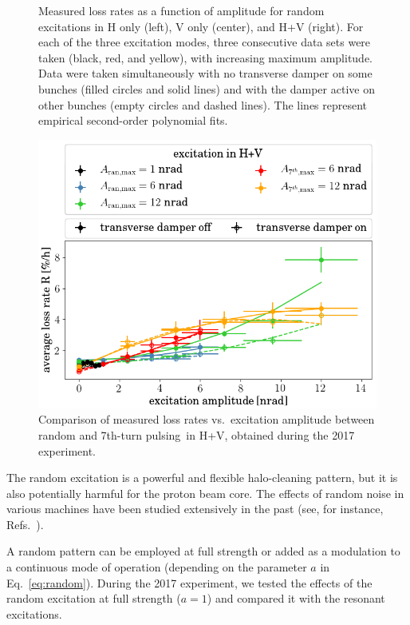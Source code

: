 \documentclass[
prstab
,reprint
,linenumbers
,longbibliography
,preprintnumbers
,showkeys
,amsfonts,amssymb,amsmath
,floatfix
]{revtex4-1}
\newcommand{\seventhtp}{7th-turn pulsing}
\begin{document}
\begin{figure}
\begin{tabular}{ccc}
  \end{tabular}
  \caption{Measured loss rates as a function of amplitude for random
    excitations in H only (left), V only (center), and H+V
    (right). For each of the three excitation modes, three consecutive
    data sets were taken (black, red, and yellow), with increasing
    maximum amplitude. Data were taken simultaneously with no
    transverse damper on some bunches (filled circles and solid lines)
    and with the damper active on other bunches (empty circles and
    dashed lines). The lines represent empirical second-order
    polynomial fits.}
  \label{fig:ranexplossplane}
\end{figure}


\begin{figure}
  \centering
  \includegraphics[width=\columnwidth]{2017_scale_amp_7th_ranhv_lblshort.png}
  \caption{Comparison of measured loss rates vs.\ excitation amplitude
    between random and \seventhtp\ in H+V, obtained during the 2017
    experiment.}
  \label{fig:ranexploss}
\end{figure}


The random excitation is a powerful and flexible halo-cleaning
pattern, but it is also potentially harmful for the proton beam
core. The effects of random noise in various machines have been
studied extensively in the past (see, for instance,
Refs.~\cite{noise_lebedev_ssc, noise_alexahin_lhc, noise_2007_ohmi,
  noise_2014_ohmi, md_noise_bbLHC}).

A random pattern can be employed at full strength or added as a
modulation to a continuous mode of operation (depending on the
parameter $a$ in Eq.~\ref{eq:random}). During the 2017 experiment, we
tested the effects of the random excitation at full strength ($a = 1$)
and compared it with the resonant excitations.
\end{document}
